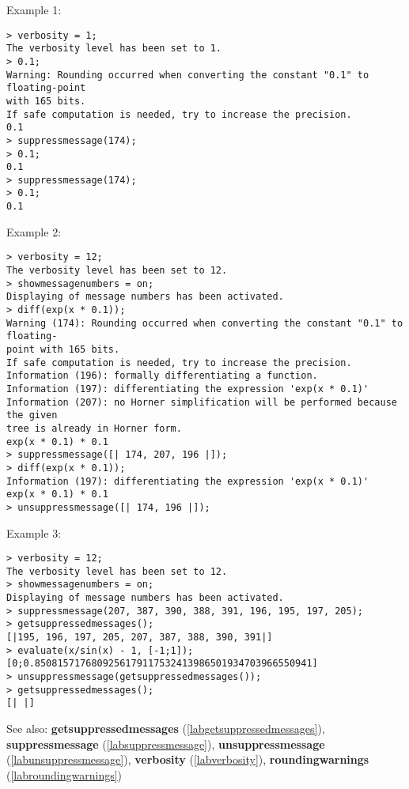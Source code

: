 \noindent Example 1: 
\begin{center}\begin{minipage}{15cm}\begin{Verbatim}[frame=single]
> verbosity = 1;
The verbosity level has been set to 1.
> 0.1;
Warning: Rounding occurred when converting the constant "0.1" to floating-point 
with 165 bits.
If safe computation is needed, try to increase the precision.
0.1
> suppressmessage(174);
> 0.1;
0.1
> suppressmessage(174);
> 0.1;
0.1
\end{Verbatim}
\end{minipage}\end{center}
\noindent Example 2: 
\begin{center}\begin{minipage}{15cm}\begin{Verbatim}[frame=single]
> verbosity = 12;
The verbosity level has been set to 12.
> showmessagenumbers = on; 
Displaying of message numbers has been activated.
> diff(exp(x * 0.1));
Warning (174): Rounding occurred when converting the constant "0.1" to floating-
point with 165 bits.
If safe computation is needed, try to increase the precision.
Information (196): formally differentiating a function.
Information (197): differentiating the expression 'exp(x * 0.1)'
Information (207): no Horner simplification will be performed because the given 
tree is already in Horner form.
exp(x * 0.1) * 0.1
> suppressmessage([| 174, 207, 196 |]);
> diff(exp(x * 0.1));
Information (197): differentiating the expression 'exp(x * 0.1)'
exp(x * 0.1) * 0.1
> unsuppressmessage([| 174, 196 |]);
\end{Verbatim}
\end{minipage}\end{center}
\noindent Example 3: 
\begin{center}\begin{minipage}{15cm}\begin{Verbatim}[frame=single]
> verbosity = 12;
The verbosity level has been set to 12.
> showmessagenumbers = on;
Displaying of message numbers has been activated.
> suppressmessage(207, 387, 390, 388, 391, 196, 195, 197, 205);
> getsuppressedmessages();
[|195, 196, 197, 205, 207, 387, 388, 390, 391|]
> evaluate(x/sin(x) - 1, [-1;1]);
[0;0.8508157176809256179117532413986501934703966550941]
> unsuppressmessage(getsuppressedmessages());
> getsuppressedmessages();
[| |]
\end{Verbatim}
\end{minipage}\end{center}
See also: \textbf{getsuppressedmessages} (\ref{labgetsuppressedmessages}), \textbf{suppressmessage} (\ref{labsuppressmessage}), \textbf{unsuppressmessage} (\ref{labunsuppressmessage}), \textbf{verbosity} (\ref{labverbosity}), \textbf{roundingwarnings} (\ref{labroundingwarnings})

